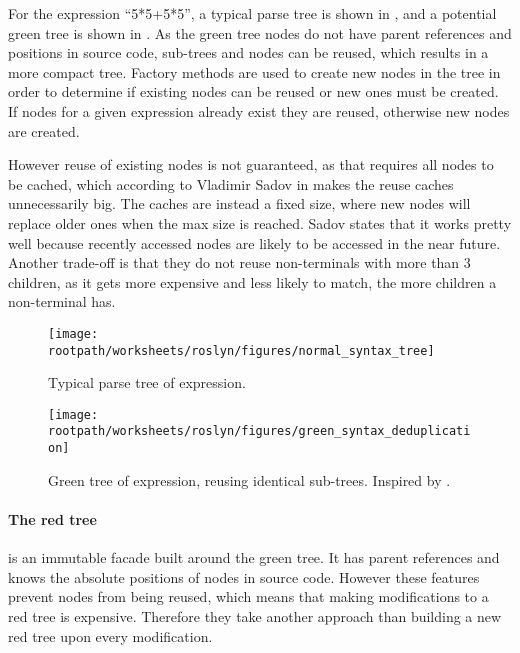 For the expression ``5*5+5*5'', a typical parse tree is shown in , and a potential green tree is shown in . As the green tree nodes do not have parent references and positions in source code, sub-trees and nodes can be reused, which results in a more compact tree. Factory methods are used to create new nodes in the tree in order to determine if existing nodes can be reused or new ones must be created. If nodes for a given expression already exist they are reused, otherwise new nodes are created. 

However reuse of existing nodes is not guaranteed, as that requires all nodes to be cached, which according to Vladimir Sadov in  makes the reuse caches unnecessarily big. The caches are instead a fixed size, where new nodes will replace older ones when the max size is reached. Sadov states that it works pretty well because recently accessed nodes are likely to be accessed in the near future. Another trade-off is that they do not reuse non-terminals with more than 3 children, as it gets more expensive and less likely to match, the more children a non-terminal has\cite{sadovRoslynPerf}.

\begin{figure}[htbp]
\centering
 \texttt{[image: \\rootpath/worksheets/roslyn/figures/normal\_syntax\_tree]} 
 \caption{Typical parse tree of expression.}
\label{fig:normal_syntax_tree}
\end{figure}

\begin{figure}[htbp]
\centering
 \texttt{[image: \\rootpath/worksheets/roslyn/figures/green\_syntax\_deduplication]} 
 \caption{Green tree of expression, reusing identical sub-trees. Inspired by \cite{sadovRoslynPerf}.}
\label{fig:green_syntax_deduplication}
\end{figure}

\paragraph{The red tree} is an immutable facade built around the green tree. It has parent references and knows the absolute positions of nodes in source code. However these features prevent nodes from being reused, which means that making modifications to a red tree is expensive. Therefore they take another approach than building a new red tree upon every modification\cite{lippert2012redgreen}. 

